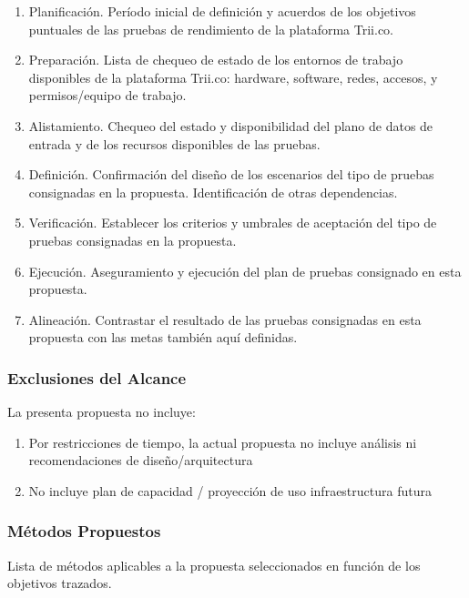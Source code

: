 \documentclass[
  paper=a4,
  ,captions=tableheading
]{scrartcl}
\providecommand{\tightlist}{%
  \setlength{\itemsep}{0pt}\setlength{\parskip}{0pt}}
\begin{document}
\begin{enumerate}
\def\labelenumi{\arabic{enumi}.}
\tightlist
\item
  Planificación. Período inicial de definición y acuerdos de los
  objetivos puntuales de las pruebas de rendimiento de la plataforma
  Trii.co.
\item
  Preparación. Lista de chequeo de estado de los entornos de trabajo
  disponibles de la plataforma Trii.co: hardware, software, redes,
  accesos, y permisos/equipo de trabajo.
\item
  Alistamiento. Chequeo del estado y disponibilidad del plano de datos
  de entrada y de los recursos disponibles de las pruebas.
\item
  Definición. Confirmación del diseño de los escenarios del tipo de
  pruebas consignadas en la propuesta. Identificación de otras
  dependencias.
\item
  Verificación. Establecer los criterios y umbrales de aceptación del
  tipo de pruebas consignadas en la propuesta.
\item
  Ejecución. Aseguramiento y ejecución del plan de pruebas consignado en
  esta propuesta.
\item
  Alineación. Contrastar el resultado de las pruebas consignadas en esta
  propuesta con las metas también aquí definidas.
\end{enumerate}

\subsubsection{Exclusiones del
Alcance}\label{sec:exclusiones-del-alcance}

La presenta propuesta no incluye:

\begin{enumerate}
\def\labelenumi{\arabic{enumi}.}
\tightlist
\item
  Por restricciones de tiempo, la actual propuesta no incluye análisis
  ni recomendaciones de diseño/arquitectura
\item
  No incluye plan de capacidad / proyección de uso infraestructura
  futura
\end{enumerate}

\subsubsection{Métodos Propuestos}\label{sec:muxe9todos-propuestos}

Lista de métodos aplicables a la propuesta seleccionados en función de
los objetivos trazados.
\end{document}
